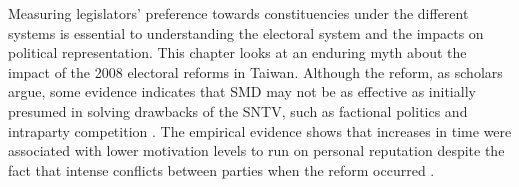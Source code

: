 Measuring legislators' preference towards constituencies under the different systems is essential to understanding the electoral system and the impacts on political representation. This chapter looks at an enduring myth about the impact of the 2008 electoral reforms in Taiwan. Although the reform, as scholars argue, some evidence indicates that SMD may not be as effective as initially presumed in solving drawbacks of the SNTV, such as factional politics and intraparty competition \citep[e.g.,][ ]{Wu2003, Batto2018}. The empirical evidence shows that increases in time were associated with lower motivation levels to run on personal reputation despite the fact that intense conflicts between parties when the reform occurred \citep{liao2020}. 